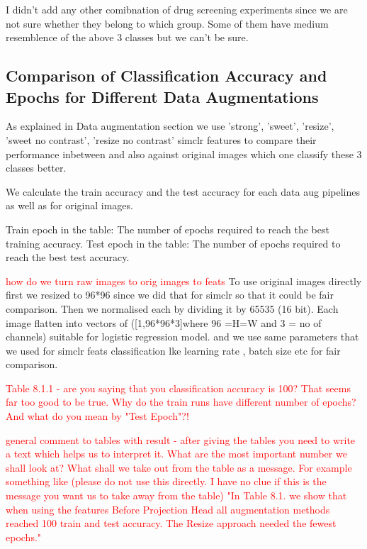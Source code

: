 I didn't add any other comibnation of drug screening experiments since we are not sure whether they belong to which group. Some of them have medium resemblence of the
 above 3 classes but we can't be sure.


\subsection{Comparison of Classification Accuracy and Epochs for Different Data Augmentations}

As explained in Data augmentation section we use  'strong', 'sweet', 'resize', 'sweet no contrast', 'resize no contrast' simclr features to compare their performance inbetween
 and also against original images which one classify these 3 classes better.

We calculate the train accuracy and the test accuracy for each data aug pipelines as well as for original images.

Train epoch in the table: The number of epochs required to reach the best training accuracy.
Test epoch in the table: The number of epochs required to reach the best test accuracy.

\textcolor{red}{how do we turn raw images to orig images to feats}
To use original images directly first we resized to 96*96 since we did that for simclr so that it could be fair comparison. Then we normalised each by dividing it by 65535 
(16 bit). Each image flatten into vectors of ([1,96*96*3]where 96 =H=W and 3 = no of channels) suitable for logistic regression model. and we use same parameters that we used 
for simclr feats classification lke learning rate , batch size etc for fair comparison.


\textcolor{red}{Table 8.1.1 - are you saying that you classification accuracy is 100?
 That seems far too good to be true. Why do the train runs have different number of epochs? And what do you mean by "Test Epoch"?!}


 \textcolor{red}{general comment to tables with result - after giving the tables you need to write a text which helps us to interpret it. What are the most important 
 number we shall look at? What shall we take out from the table as a message. For example something like (please do not use this directly. I have no clue 
 if this is the message you want us to take away from the table) "In Table 8.1. we show that when using the features Before Projection Head all 
 augmentation methods reached 100 train and test accuracy. The Resize approach needed the fewest epochs."}
    
